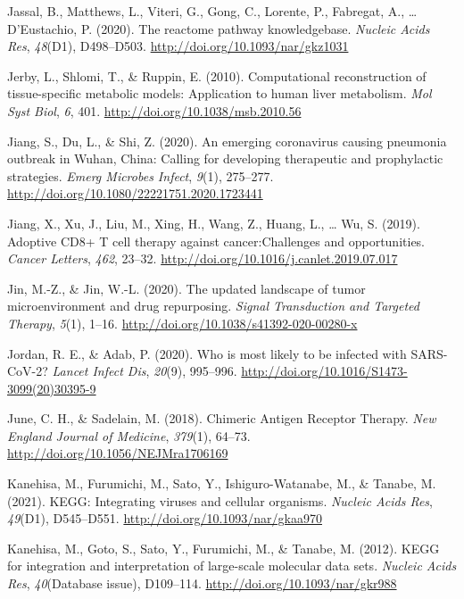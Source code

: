 \documentclass[12pt,twoside,openany,\mydriver]{thesis}  %
\begin{document}
\leavevmode\hypertarget{ref-jassal_reactome_2020}{}%
Jassal, B., Matthews, L., Viteri, G., Gong, C., Lorente, P., Fabregat, A., \ldots{} D'Eustachio, P. (2020). The reactome pathway knowledgebase. \emph{Nucleic Acids Res}, \emph{48}(D1), D498--D503. \url{http://doi.org/10.1093/nar/gkz1031}

\leavevmode\hypertarget{ref-jerby_computational_2010}{}%
Jerby, L., Shlomi, T., \& Ruppin, E. (2010). Computational reconstruction of tissue-specific metabolic models: Application to human liver metabolism. \emph{Mol Syst Biol}, \emph{6}, 401. \url{http://doi.org/10.1038/msb.2010.56}

\leavevmode\hypertarget{ref-jiang_emerging_2020}{}%
Jiang, S., Du, L., \& Shi, Z. (2020). An emerging coronavirus causing pneumonia outbreak in Wuhan, China: Calling for developing therapeutic and prophylactic strategies. \emph{Emerg Microbes Infect}, \emph{9}(1), 275--277. \url{http://doi.org/10.1080/22221751.2020.1723441}

\leavevmode\hypertarget{ref-jiang_adoptive_2019}{}%
Jiang, X., Xu, J., Liu, M., Xing, H., Wang, Z., Huang, L., \ldots{} Wu, S. (2019). Adoptive CD8+ T cell therapy against cancer:Challenges and opportunities. \emph{Cancer Letters}, \emph{462}, 23--32. \url{http://doi.org/10.1016/j.canlet.2019.07.017}

\leavevmode\hypertarget{ref-jin_updated_2020}{}%
Jin, M.-Z., \& Jin, W.-L. (2020). The updated landscape of tumor microenvironment and drug repurposing. \emph{Signal Transduction and Targeted Therapy}, \emph{5}(1), 1--16. \url{http://doi.org/10.1038/s41392-020-00280-x}

\leavevmode\hypertarget{ref-jordan_who_2020}{}%
Jordan, R. E., \& Adab, P. (2020). Who is most likely to be infected with SARS-CoV-2? \emph{Lancet Infect Dis}, \emph{20}(9), 995--996. \url{http://doi.org/10.1016/S1473-3099(20)30395-9}

\leavevmode\hypertarget{ref-june_chimeric_2018}{}%
June, C. H., \& Sadelain, M. (2018). Chimeric Antigen Receptor Therapy. \emph{New England Journal of Medicine}, \emph{379}(1), 64--73. \url{http://doi.org/10.1056/NEJMra1706169}

\leavevmode\hypertarget{ref-kanehisa_kegg_2021}{}%
Kanehisa, M., Furumichi, M., Sato, Y., Ishiguro-Watanabe, M., \& Tanabe, M. (2021). KEGG: Integrating viruses and cellular organisms. \emph{Nucleic Acids Res}, \emph{49}(D1), D545--D551. \url{http://doi.org/10.1093/nar/gkaa970}

\leavevmode\hypertarget{ref-kanehisa_kegg_2012}{}%
Kanehisa, M., Goto, S., Sato, Y., Furumichi, M., \& Tanabe, M. (2012). KEGG for integration and interpretation of large-scale molecular data sets. \emph{Nucleic Acids Res}, \emph{40}(Database issue), D109--114. \url{http://doi.org/10.1093/nar/gkr988}
\end{document}
